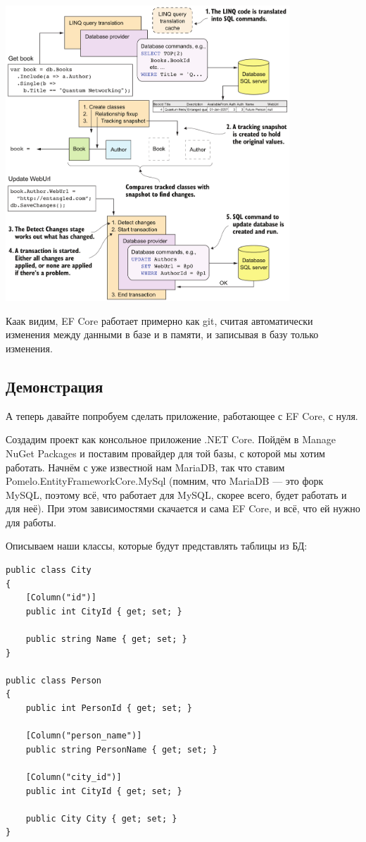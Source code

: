 \documentclass[a5paper]{article}
\begin{document}
\begin{center}
    \includegraphics[width=0.8\textwidth]{efCoreUpdate.png}
\end{center}

Каак видим, EF Core работает примерно как git, считая автоматически изменения между данными в базе и в памяти, и записывая в базу только изменения.

\subsection{Демонстрация}

А теперь давайте попробуем сделать приложение, работающее с EF Core, с нуля.

Создадим проект как консольное приложение .NET Core. Пойдём в Manage NuGet Packages и поставим провайдер для той базы, с которой мы хотим работать. Начнём с уже известной нам MariaDB, так что ставим Pomelo.EntityFrameworkCore.MySql (помним, что MariaDB --- это форк MySQL, поэтому всё, что работает для MySQL, скорее всего, будет работать и для неё). При этом зависимостями скачается и сама EF Core, и всё, что ей нужно для работы.

Описываем наши классы, которые будут представлять таблицы из БД:

\begin{verbatim}
public class City
{
    [Column("id")]
    public int CityId { get; set; }

    public string Name { get; set; }
}

public class Person
{
    public int PersonId { get; set; }

    [Column("person_name")]
    public string PersonName { get; set; }

    [Column("city_id")]
    public int CityId { get; set; }

    public City City { get; set; }
}
\end{verbatim}
\end{document}
